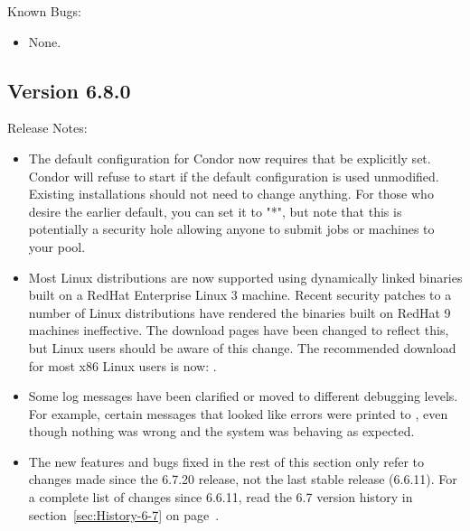 \noindent Known Bugs:

\begin{itemize}

\item None.

\end{itemize}




\subsection*{\label{sec:New-6-8-0}Version 6.8.0}

\noindent Release Notes:

\begin{itemize}

\item The default configuration for Condor now requires that
 be explicitly set.  Condor will refuse
to start if the default configuration is used unmodified.
Existing installations should not need to change anything.  For
those who desire the earlier default, you can set it to "*", but
note that this is potentially a security hole allowing anyone to
submit jobs or machines to your pool.

\item Most Linux distributions are now supported using dynamically
  linked binaries built on a RedHat Enterprise Linux 3 machine.
  Recent security patches to a number of Linux distributions have
  rendered the binaries built on RedHat 9 machines ineffective.
  The download pages have been changed to reflect this, but Linux users
  should be aware of this change.
  The recommended download for most x86 Linux users is now:
  .

\item Some log messages have been clarified or moved to different
  debugging levels.
  For example, certain messages that looked like errors were printed
  to , even though nothing was wrong and the system was
  behaving as expected.

\item The new features and bugs fixed in the rest of this section only
  refer to changes made since the 6.7.20 release, not the last stable
  release (6.6.11).
  For a complete list of changes since 6.6.11, read the 6.7 version
  history in section~\ref{sec:History-6-7} on
  page~\pageref{sec:History-6-7}. 

\end{itemize}


